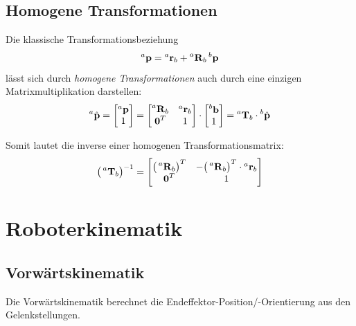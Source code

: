 	\section{Homogene Transformationen} %
		Die klassische Transformationsbeziehung
		\begin{equation*}
			\prescript{a}{}{\boldsymbol{\mathrm{p}}} = \prescript{a}{}{\boldsymbol{\mathrm{r}}}_b + \prescript{a}{}{\boldsymbol{\mathrm{R}}}_b \prescript{b}{}{\boldsymbol{\mathrm{p}}}
		\end{equation*}
		lässt sich durch \emph{homogene Transformationen} auch durch eine einzigen Matrixmultiplikation darstellen:
		\begin{equation*}
			\prescript{a}{}{\hat{\boldsymbol{\mathrm{p}}}} =
				\begin{bmatrix}
					\prescript{a}{}{\boldsymbol{\mathrm{p}}} \\
					1
				\end{bmatrix}
			=
				\begin{bmatrix}
					\prescript{a}{}{\boldsymbol{\mathrm{R}}}_b & \prescript{a}{}{\boldsymbol{\mathrm{r}}}_b \\
					\boldsymbol{\mathrm{0}}^T                    & 1
				\end{bmatrix}
			\cdot
				\begin{bmatrix}
					\prescript{b}{}{\boldsymbol{\mathrm{b}}} \\
					1
				\end{bmatrix}
			= \prescript{a}{}{\boldsymbol{\mathrm{T}}}_b \cdot \prescript{b}{}{\hat{\boldsymbol{\mathrm{p}}}}
		\end{equation*}

		Somit lautet die inverse einer homogenen Transformationsmatrix:
		\begin{equation*}
			\big(\prescript{a}{}{\boldsymbol{\mathrm{T}}}_b\big)^{-1} =
				\begin{bmatrix}
					\big(\prescript{a}{}{\boldsymbol{\mathrm{R}}}_b\big)^T & -\big(\prescript{a}{}{\boldsymbol{\mathrm{R}}}_b\big)^T \cdot \prescript{a}{}{\boldsymbol{\mathrm{r}}}_b \\
					\boldsymbol{\mathrm{0}}^T                                & 1
				\end{bmatrix}
		\end{equation*}

\chapter{Roboterkinematik}
	\section{Vorwärtskinematik}
		Die Vorwärtskinematik \DIRKIN berechnet die Endeffektor-Position/-Orientierung aus den Gelenkstellungen.
	
